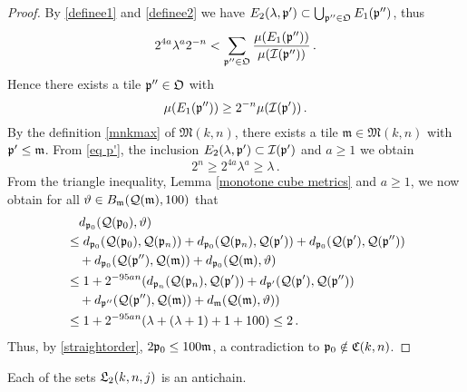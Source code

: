 {\begin{proof}
    By \eqref{definee1} and \eqref{definee2} we have $E_2(\lambda, \mathfrak p') \subset \bigcup_{\mathfrak p'' \in \mathfrak{O}} E_1(\mathfrak p'')$, thus
    $$
        2^{4a}\lambda^a 2^{-n} < \sum_{\mathfrak p'' \in \mathfrak{O}} \frac{\mu(E_1(\mathfrak p''))}{\mu(\mathcal{I}(\mathfrak p''))}\,.
    $$
    Hence there exists a tile $\mathfrak p'' \in \mathfrak{O}$ with
    \begin{equation*}
        \mu(E_1(\mathfrak p'')) \ge 2^{-n} \mu(\mathcal{I}(\mathfrak p'))\,.
    \end{equation*}
    By the definition \eqref{mnkmax} of $\mathfrak{M}(k,n)$, there exists a tile $\mathfrak{m} \in \mathfrak{M}(k,n)$ with $\mathfrak p' \leq \mathfrak{m}$. From \eqref{eq p'}, the inclusion $E_2(\lambda, \mathfrak p') \subset \mathcal{I}(\mathfrak p')$ and $a\ge 1$ we obtain
    $$
        2^n \geq 2^{4a} \lambda^{a} \geq \lambda\,.
    $$
    From the triangle inequality, Lemma \ref{monotone cube metrics} and $a \ge 1$, we now obtain for all $\vartheta \in B_{\mathfrak{m}}(\mathcal{Q}(\mathfrak{m}), 100)$ that
    \begin{align*}
        &\quad d_{\mathfrak p_0}(\mathcal{Q}(\mathfrak p_0), \vartheta)\\
        &\leq d_{\mathfrak p_0}(\mathcal{Q}(\mathfrak p_0), \mathcal{Q}(\mathfrak p_{n}))  + d_{\mathfrak p_0}(\mathcal{Q}(\mathfrak p_{n}), \mathcal{Q}(\mathfrak p'))  + d_{\mathfrak p_0}(\mathcal{Q}(\mathfrak p'), \mathcal{Q}(\mathfrak p''))\\
        &\quad+ d_{\mathfrak p_0}(\mathcal{Q}(\mathfrak p''), \mathcal{Q}(\mathfrak{m})) +
        d_{\mathfrak p_0}(\mathcal{Q}(\mathfrak{m}), \vartheta)\\
        &\leq 1 + 2^{-95an} (d_{\mathfrak p_{n}}(\mathcal{Q}(\mathfrak p_n), \mathcal{Q}(\mathfrak p'))  + d_{\mathfrak p'}(\mathcal{Q}(\mathfrak p'), \mathcal{Q}(\mathfrak p''))\\
        &\quad+ d_{\mathfrak p''}(\mathcal{Q}(\mathfrak p''), \mathcal{Q}(\mathfrak{m})) +
        d_{\mathfrak{m}}(\mathcal{Q}(\mathfrak{m}), \vartheta))\\
        &\leq 1 + 2^{-95an}(\lambda + (\lambda + 1) + 1 + 100) \leq 2\,.
    \end{align*}
    Thus, by \eqref{straightorder}, $2\mathfrak p_0 \leq 100\mathfrak{m}$, a contradiction to $\mathfrak p_0 \notin \mathfrak C(k,n)$.
\end{proof}

\begin{lemma}
\label{L2 antichain}
    Each of the sets $\mathfrak L_2(k,n,j)$ is an antichain.
\end{lemma}

}
